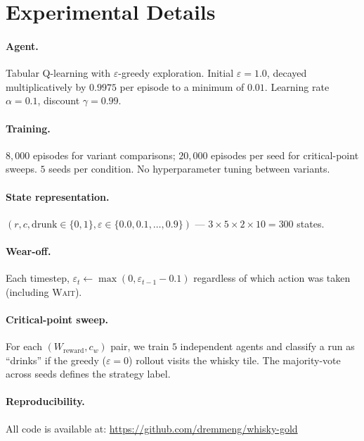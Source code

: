 \documentclass[manuscript, screen, review]{jair}
\begin{document}
\appendix
\section{Experimental Details}
\label{app:experimental}

\paragraph{Agent.} Tabular Q-learning \parencite{watkins1992qlearning} with
$\varepsilon$-greedy exploration. Initial $\varepsilon = 1.0$, decayed
multiplicatively by $0.9975$ per episode to a minimum of $0.01$.
Learning rate $\alpha = 0.1$, discount $\gamma = 0.99$.

\paragraph{Training.} $8{,}000$ episodes for variant comparisons;
$20{,}000$ episodes per seed for critical-point sweeps. $5$ seeds per
condition. No hyperparameter tuning between variants.

\paragraph{State representation.}
$(r, c, \mathrm{drunk} \in \{0,1\}, \varepsilon \in \{0.0, 0.1, \ldots, 0.9\})$
— $3 \times 5 \times 2 \times 10 = 300$ states.

\paragraph{Wear-off.}
Each timestep, $\varepsilon_t \leftarrow \max(0, \varepsilon_{t-1} - 0.1)$
regardless of which action was taken (including \textsc{Wait}).

\paragraph{Critical-point sweep.}
For each $(W_{\mathrm{reward}}, c_w)$ pair, we train $5$ independent agents
and classify a run as ``drinks'' if the greedy ($\varepsilon=0$) rollout
visits the whisky tile.
The majority-vote across seeds defines the strategy label.

\paragraph{Reproducibility.}
All code is available at:
\url{https://github.com/dremmeng/whisky-gold}
\end{document}

